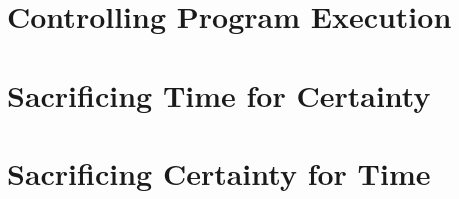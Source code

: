 \blindtext

\section{Controlling Program Execution}
\label{sec:sct-fundamentals}
\blindtext

\section{Sacrificing Time for Certainty}
\label{sec:sct-complete}
\blindtext

\section{Sacrificing Certainty for Time}
\label{sec:sct-incomplete}
\blindtext
